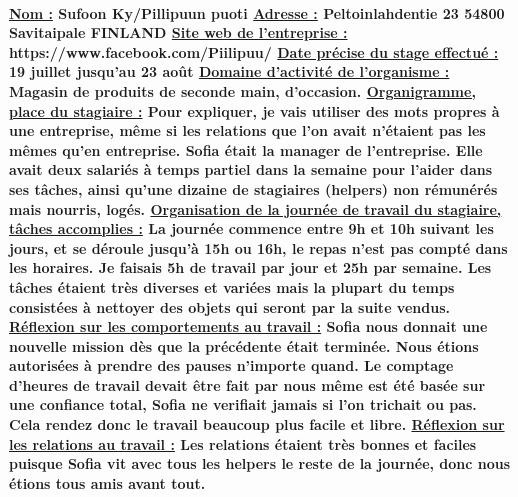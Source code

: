 \documentclass[a4paper,12pt]{report} %
\begin{document}
\paragraph{\underline{Nom :} \newline \textbf{Sufoon Ky/Pillipuun puoti} \newline
\underline{Adresse :} \newline \textbf{Peltoinlahdentie 23  54800 Savitaipale FINLAND} \newline
\underline{Site web de l'entreprise :} \newline \textbf{https://www.facebook.com/Piilipuu/} \newline
\underline{Date précise du stage effectué :} \newline \textbf{19 juillet jusqu'au 23 août} \newline
\underline{Domaine d'activité de l'organisme :} \newline \textbf{Magasin de produits de seconde main, d'occasion.} \newline
\underline{Organigramme, place du stagiaire :} \newline \textbf{Pour expliquer, je vais utiliser des mots propres à une entreprise, même si les relations que l'on avait n'étaient pas les mêmes qu'en entreprise. Sofia était la manager de l'entreprise. Elle avait deux salariés à temps partiel dans la semaine pour l'aider dans ses tâches, ainsi qu'une dizaine de stagiaires (helpers) non rémunérés mais nourris, logés.} \newline
\underline{Organisation de la journée de travail du stagiaire, tâches accomplies :} \newline \textbf{La journée commence entre 9h et 10h suivant les jours, et se déroule jusqu'à 15h ou 16h, le repas n'est pas compté dans les horaires. Je faisais 5h de travail par jour et 25h par semaine. Les tâches étaient très diverses et variées mais la plupart du temps consistées à nettoyer des objets qui seront par la suite vendus.} \newline
\underline{Réflexion sur les comportements au travail :} \newline \textbf{Sofia nous donnait une nouvelle mission dès que la précédente était terminée. Nous étions autorisées à prendre des pauses n'importe quand. Le comptage d'heures de travail devait être fait par nous même est été basée sur une confiance total, Sofia ne verifiait jamais si l'on trichait ou pas. Cela rendez donc le travail beaucoup plus facile et libre.} \newline
\underline{Réflexion sur les relations au travail :} \newline \textbf{Les relations étaient très bonnes et faciles puisque Sofia vit avec tous les helpers le reste de la journée, donc nous étions tous amis avant tout.}}
\end{document}
